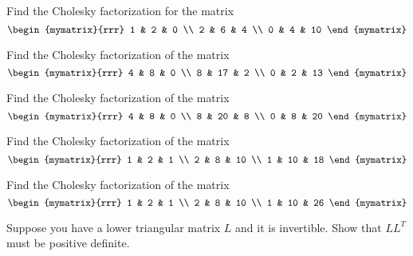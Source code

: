 
\begin{ex} Find the Cholesky factorization for the matrix
\begin{equation*}
\allowbreak \begin{mymatrix}{rrr}
1 & 2 & 0 \\
2 & 6 & 4 \\
0 & 4 & 10
\end{mymatrix}
\end{equation*}
\end{ex}

\begin{ex} Find the Cholesky factorization of the matrix
\begin{equation*}
\begin{mymatrix}{rrr}
4 & 8 & 0 \\
8 & 17 & 2 \\
0 & 2 & 13
\end{mymatrix}
\end{equation*}
\end{ex}

\begin{ex} Find the Cholesky factorization of the matrix
\begin{equation*}
\begin{mymatrix}{rrr}
4 & 8 & 0 \\
8 & 20 & 8 \\
0 & 8 & 20
\end{mymatrix}
\end{equation*}
\end{ex}

\begin{ex} Find the Cholesky factorization of the matrix
\begin{equation*}
\begin{mymatrix}{rrr}
1 & 2 & 1 \\
2 & 8 & 10 \\
1 & 10 & 18
\end{mymatrix}
\end{equation*}
\end{ex}

\begin{ex} Find the Cholesky factorization of the matrix
\begin{equation*}
\begin{mymatrix}{rrr}
1 & 2 & 1 \\
2 & 8 & 10 \\
1 & 10 & 26
\end{mymatrix}
\end{equation*}
\end{ex}

\begin{ex} Suppose you have a lower triangular matrix $L$ and it is invertible.
Show that $LL^{T}$ must be positive definite.
\end{ex}

